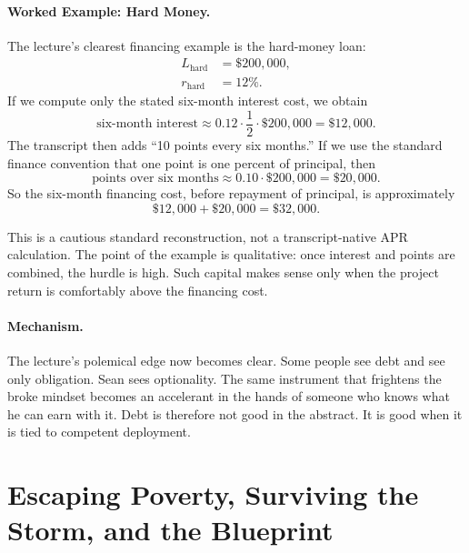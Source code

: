 \paragraph{Worked Example: Hard Money.}
The lecture's clearest financing example is the hard-money loan:
\begin{align}
L_{\text{hard}} &= \$200{,}000,\\
r_{\text{hard}} &= 12\%.
\end{align}
If we compute only the stated six-month interest cost, we obtain
\begin{equation}
\text{six-month interest} \approx 0.12 \cdot \frac{1}{2} \cdot \$200{,}000 = \$12{,}000.
\end{equation}
The transcript then adds ``10 points every six months.'' If we use the standard finance convention that one point is one percent of principal, then
\begin{equation}
\text{points over six months} \approx 0.10 \cdot \$200{,}000 = \$20{,}000.
\end{equation}
So the six-month financing cost, before repayment of principal, is approximately
\begin{equation}
\$12{,}000 + \$20{,}000 = \$32{,}000.
\end{equation}

\begin{remark}
This is a cautious standard reconstruction, not a transcript-native APR calculation. The point of the example is qualitative: once interest and points are combined, the hurdle is high. Such capital makes sense only when the project return is comfortably above the financing cost.
\end{remark}

\paragraph{Mechanism.}
The lecture's polemical edge now becomes clear. Some people see debt and see only obligation. Sean sees optionality. The same instrument that frightens the broke mindset becomes an accelerant in the hands of someone who knows what he can earn with it. Debt is therefore not good in the abstract. It is good when it is tied to competent deployment.

\section{Escaping Poverty, Surviving the Storm, and the Blueprint}

